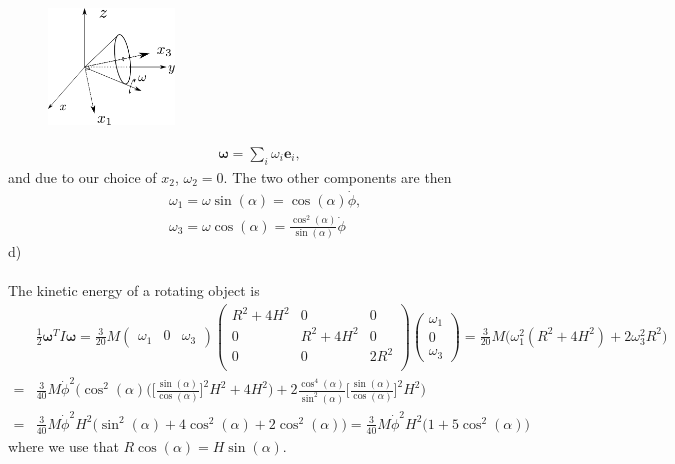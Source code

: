 \documentclass{article}
\begin{document}
        \newpage %
        \begin{figure}         
            \includegraphics[width=0.3\textwidth]{figures/exercise_7_3_cone3.pdf}
        \end{figure}
        \begin{align*}
            \boldsymbol{\omega} = \sum_i \omega_i \mathbf{e}_i,
        \end{align*}
        and due to our choice of $x_2$, $\omega_2 = 0$. The two other components are then
        \begin{align*}
            &\omega_1 = \omega \sin(\alpha) =  \cos(\alpha) \dot \phi,  \\
            &\omega_3 = \omega \cos(\alpha) =  \frac{\cos^2(\alpha)}{\sin(\alpha)} \dot \phi
        \end{align*}
        d) \\ \\
        The kinetic energy of a rotating object is
        \begin{align*}
            &\frac{1}{2} \boldsymbol{\omega}^T I \boldsymbol{\omega} = \frac{3}{20} M
            \begin{pmatrix*}
                \omega_1 &
                0&
                \omega_3
            \end{pmatrix*}
            \begin{pmatrix}
                R^2 + 4H^2& 0 & 0 \\
                0 & R^2 + 4H^2& 0 \\
                0 & 0 & 2R^2\\
            \end{pmatrix}
            \begin{pmatrix*}
                \omega_1 \\
                0 \\
                \omega_3
            \end{pmatrix*}
            = \frac{3}{20} M \bigg(\omega_1^2 (R^2 + 4H^2) + 2\omega_3^2R^2\bigg) \\
            = &\frac{3}{40} M \dot \phi^2 \bigg(\cos^2(\alpha)\bigg(\bigg[\frac{\sin(\alpha)}{\cos(\alpha)}\bigg]^2H^2 + 4H^2\bigg) + 2\frac{\cos^4(\alpha)}{\sin^2(\alpha)}\bigg[\frac{\sin(\alpha)}{\cos(\alpha)}\bigg]^2H^2 \bigg) \\
            = &\frac{3}{40} M \dot \phi^2 H^2 \bigg(\sin^2(\alpha) + 4\cos^2(\alpha)+ 2 \cos^2(\alpha)\bigg) = \frac{3}{40} M \dot \phi^2 H^2 \bigg(1 + 5\cos^2(\alpha)\bigg)
        \end{align*}
        where we use that $R\cos(\alpha) =  H \sin(\alpha)$.
\end{document}
